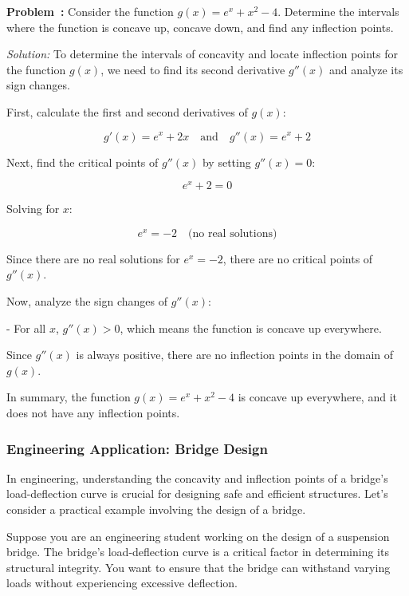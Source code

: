 \documentclass[a4paper,12pt]{book}
\newcounter{problem}
\newenvironment{problem}[1][\theproblem]
{\refstepcounter{problem}\par\medskip\noindent\textbf{Problem~#1:} \rmfamily}{\medskip}
\newenvironment{solution}[1][]
{\par\noindent\textit{Solution:} \rmfamily}{\medskip}
\newcounter{example}
\begin{document}
\begin{problem}
Consider the function \(g(x) = e^x + x^2 - 4\). Determine the intervals where the function is concave up, concave down, and find any inflection points.
\end{problem}

\begin{solution}
To determine the intervals of concavity and locate inflection points for the function \(g(x)\), we need to find its second derivative \(g''(x)\) and analyze its sign changes.

First, calculate the first and second derivatives of \(g(x)\):

\[
g'(x) = e^x + 2x \quad \text{and} \quad g''(x) = e^x + 2
\]

Next, find the critical points of \(g''(x)\) by setting \(g''(x) = 0\):

\[
e^x + 2 = 0
\]

Solving for \(x\):

\[
e^x = -2 \quad \text{(no real solutions)}
\]

Since there are no real solutions for \(e^x = -2\), there are no critical points of \(g''(x)\).

Now, analyze the sign changes of \(g''(x)\):

- For all \(x\), \(g''(x) > 0\), which means the function is concave up everywhere.

Since \(g''(x)\) is always positive, there are no inflection points in the domain of \(g(x)\).

In summary, the function \(g(x) = e^x + x^2 - 4\) is concave up everywhere, and it does not have any inflection points.
\end{solution}

\subsubsection*{Engineering Application: Bridge Design}

In engineering, understanding the concavity and inflection points of a bridge's load-deflection curve is crucial for designing safe and efficient structures. Let's consider a practical example involving the design of a bridge.

Suppose you are an engineering student working on the design of a suspension bridge. The bridge's load-deflection curve is a critical factor in determining its structural integrity. You want to ensure that the bridge can withstand varying loads without experiencing excessive deflection.
\end{document}
